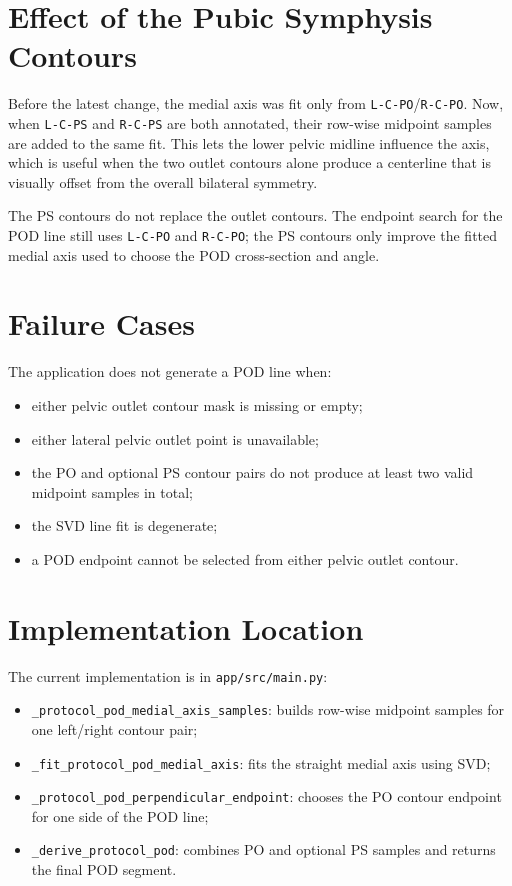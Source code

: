\documentclass[11pt]{article}
\begin{document}
\section*{Effect of the Pubic Symphysis Contours}

Before the latest change, the medial axis was fit only from
\texttt{L-C-PO}/\texttt{R-C-PO}. Now, when \texttt{L-C-PS} and \texttt{R-C-PS}
are both annotated, their row-wise midpoint samples are added to the same fit.
This lets the lower pelvic midline influence the axis, which is useful when the
two outlet contours alone produce a centerline that is visually offset from the
overall bilateral symmetry.

The PS contours do not replace the outlet contours. The endpoint search for the
POD line still uses \texttt{L-C-PO} and \texttt{R-C-PO}; the PS contours only
improve the fitted medial axis used to choose the POD cross-section and angle.

\section*{Failure Cases}

The application does not generate a POD line when:

\begin{itemize}
    \raggedright
    \item either pelvic outlet contour mask is missing or empty;
    \item either lateral pelvic outlet point is unavailable;
    \item the PO and optional PS contour pairs do not produce at least two valid
    midpoint samples in total;
    \item the SVD line fit is degenerate;
    \item a POD endpoint cannot be selected from either pelvic outlet contour.
\end{itemize}

\section*{Implementation Location}

The current implementation is in \texttt{app/src/main.py}:

\begin{itemize}
    \item \texttt{\_protocol\_pod\_medial\_axis\_samples}: builds row-wise
    midpoint samples for one left/right contour pair;
    \item \texttt{\_fit\_protocol\_pod\_medial\_axis}: fits the straight medial
    axis using SVD;
    \item \texttt{\_protocol\_pod\_perpendicular\_endpoint}: chooses the PO
    contour endpoint for one side of the POD line;
    \item \texttt{\_derive\_protocol\_pod}: combines PO and optional PS samples
    and returns the final POD segment.
\end{itemize}
\end{document}
